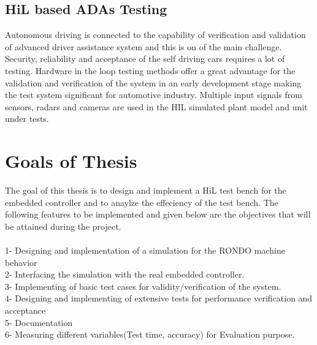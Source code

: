 \documentclass{listhesis}
\begin{document}
\subsection{HiL based ADAs Testing}
Autonomous driving is connected to the capability of verification and validation of advanced driver assistance system and this is on of the main challenge. Security, reliability and acceptance of the self driving cars requires a lot of testing. Hardware in the loop testing methods offer a great advantage for the validation and verification of the system in an early development stage making the test system significant for automotive industry. Multiple input signals from sensors, radars and cameras are used in the HIL simulated plant model and unit under tests.



\section{Goals of Thesis}
The goal of this thesis is to design and implement a HiL test bench for the embedded controller and to anaylze the effeciency of the test bench. The following features to be implemented and given below are the objectives that will be attained during the project. \\
\\
1-	Designing and implementation of a simulation for the RONDO machine behavior \\
2-	Interfacing the simulation with the real embedded controller. \\
3-	Implementing of basic test cases for validity/verification of the system. \\
4-	Designing and implementing of extensive tests for performance verification and acceptance  \\
5-	Documentation \\
6-	Measuring different variables(Test time, accuracy) for Evaluation purpose. \\
\end{document}
